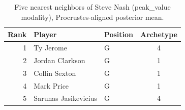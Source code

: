 \begin{table}[htbp]
  \centering\small
  \begin{tabular}{rllc}
    \toprule
    Rank & Player & Position & Archetype \\
    \midrule
    1 & Ty Jerome & G & 4 \\
    2 & Jordan Clarkson & G & 1 \\
    3 & Collin Sexton & G & 1 \\
    4 & Mark Price & G & 1 \\
    5 & Sarunas Jasikevicius & G & 4 \\
    \bottomrule
  \end{tabular}
  \caption{Five nearest neighbors of Steve Nash (peak_value modality), Procrustes-aligned posterior mean.}
  \label{tab:Steve_Nash_neighbors_peak_value}
\end{table}

